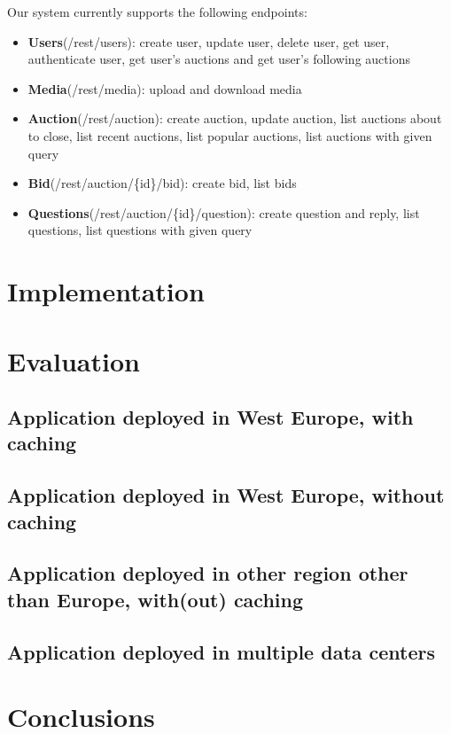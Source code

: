 \documentclass{article}
\begin{document}
Our system currently supports the following endpoints:
\begin{itemize}
    \item \textbf{Users}(/rest/users): create user, update user, delete user, get user, authenticate user, get user's auctions and get user's following auctions
    \item \textbf{Media}(/rest/media): upload and download media
    \item \textbf{Auction}(/rest/auction): create auction, update auction, list auctions about to close, list recent auctions, list popular auctions, list auctions with given query
    \item \textbf{Bid}(/rest/auction/\{id\}/bid): create bid, list bids
    \item \textbf{Questions}(/rest/auction/\{id\}/question): create question and reply, list questions, list questions with given query
\end{itemize}

\section{Implementation}

\section{Evaluation}
\subsection{Application deployed in West Europe, with caching}
\subsection{Application deployed in West Europe, without caching}
\subsection{Application deployed in other region other than Europe, with(out) caching}
\subsection{Application deployed in multiple data centers}
\section{Conclusions}
\end{document}

